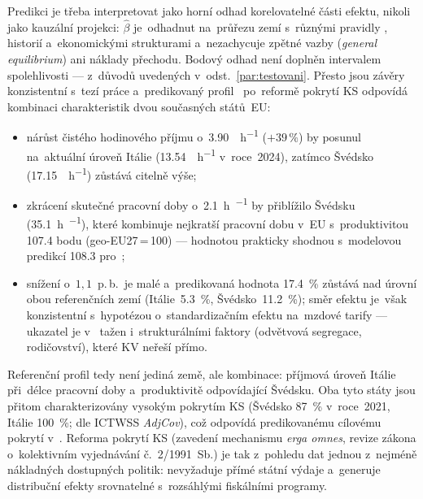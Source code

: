 Predikci je třeba interpretovat jako horní odhad korelovatelné části efektu,
nikoli jako kauzální projekci: $\hat{\beta}$ je~odhadnut na~průřezu zemí
s~různými pravidly , historií a~ekonomickými strukturami a~nezachycuje
zpětné vazby (\textit{general equilibrium}) ani náklady přechodu. Bodový
odhad není doplněn intervalem spolehlivosti --- z~důvodů uvedených
v~odst.~\ref{par:testovani}. Přesto jsou závěry konzistentní s~tezí práce
a~predikovaný profil~ po~reformě pokrytí \acs{KS} odpovídá kombinaci
charakteristik dvou současných států~\acs{EU}:
\begin{itemize}
  \item nárůst čistého hodinového příjmu o~\SI{3,90}{\pps\per\hour} ($+39\,\%$)
    by  posunul na~aktuální úroveň Itálie
    (\SI{13,54}{\pps\per\hour} v~roce~2024), zatímco Švédsko
    (\SI{17,15}{\pps\per\hour}) zůstává citelně výše;
  \item zkrácení skutečné pracovní doby o~\SI{2,1}{\hour\per\week} by 
    přiblížilo Švédsku (\SI{35,1}{\hour\per\week}), které kombinuje
    nejkratší pracovní dobu v~\acs{EU} s~produktivitou \num{107,4} bodu
    (\acs{geo-EU27}\,=\,100) --- hodnotou prakticky shodnou s~modelovou
    predikcí \num{108,3} pro~;
  \item snížení  o~$1{,}1$~p.\,b.\ je malé a~predikovaná hodnota
    \SI{17,4}{\percent} zůstává nad úrovní obou referenčních zemí
    (Itálie~\SI{5,3}{\percent}, Švédsko~\SI{11,2}{\percent}); směr efektu
    je~však konzistentní s~hypotézou o~standardizačním efektu 
    na~mzdové tarify --- ukazatel je v~ tažen i~strukturálními
    faktory (odvětvová segregace, rodičovství), které \acs{KV} neřeší
    přímo.
\end{itemize}
Referenční profil tedy není jediná země, ale kombinace: příjmová úroveň
Itálie při~délce pracovní doby a~produktivitě odpovídající Švédsku. Oba tyto
státy jsou přitom charakterizovány vysokým pokrytím \acs{KS} (Švédsko
\SI{87}{\percent} v~roce~2021, Itálie \SI{100}{\percent}; dle \acs{ICTWSS}
\textit{AdjCov}), což odpovídá predikovanému cílovému pokrytí v~.
Reforma pokrytí \acs{KS} (zavedení mechanismu \textit{erga omnes}, revize
zákona o~kolektivním vyjednávání č.~2/1991~Sb.) je tak
z~pohledu dat jednou z~nejméně nákladných dostupných politik: nevyžaduje
přímé státní výdaje a~generuje distribuční efekty srovnatelné s~rozsáhlými
fiskálními programy.~\cite{zakon_kv_1991}
